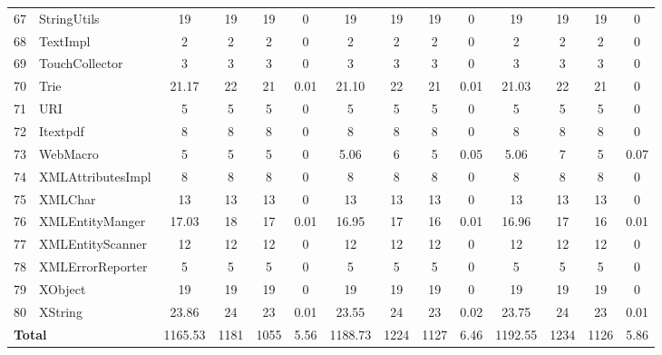 \documentclass[conference]{IEEEtran}
\begin{document}
\begin{table} [ht!]
{\begin{tabular}{c l c c c c c c c c c c c c}
 67						& StringUtils					&19 	&	19	&	19	& 		0					& 19		& 19 		& 19		& 		0			& 19			& 19			& 19			&	0\\      
 68						& TextImpl					& 2 	&	2	&	2	& 		0					& 2		&  2		& 2		& 		0			& 2			& 2			& 2			&	0\\      
 69						& TouchCollector				& 3	&	3	&	3	& 		0					& 3		&  3		& 3		& 		0			& 3			& 3			& 3			&	0\\      
 70						& Trie						& 21.17&	22	&	21	& 		0.01					& 21.10	&  22		& 21		& 		0.01			& 21.03		& 22			& 21			&	0\\      
 71						& URI						& 5 	&	5	&	5	& 		0					& 5		&  5		& 5		& 		0			& 5			& 5			& 5			&	0\\      
 72						& Itextpdf						& 8	&	8	&	8	& 		0					& 8		&  8		& 8		& 		0			& 8			& 8			& 8			&	0\\      
 73						& WebMacro					& 5	&	5	&	5	& 		0					& 5.06	&  6		& 5		& 		0.05			& 5.06		& 7			& 5			&	0.07\\      
 74						& XMLAttributesImpl				& 8	&	8	&	8	& 		0					& 8		&  8		& 8		& 		0			& 8			& 8			& 8			&	0\\      
 75						& XMLChar					& 13	&	13	&	13	& 		0					& 13		&  13		& 13		& 		0			& 13			& 13			& 13			&	0\\      
 76						& XMLEntityManger				& 17.03&	18	&	17	& 		0.01					& 16.95	&  17		& 16		& 		0.01			& 16.96		& 17			& 16			&	0.01\\      
 77						& XMLEntityScanner				& 12	&	12	&	12	& 		0					& 12		&  12		& 12		& 		0			& 12			& 12			& 12			&	0\\      
 78						& XMLErrorReporter				& 5	&	5	&	5	& 		0					& 5		&  5		& 5		& 		0			& 5			& 5			& 5			&	0\\      
 79						& XObject						& 19	&	19	&	19	& 		0					& 19		&  19		& 19		& 		0			& 19			& 19			& 19			&	0\\      
 80						& XString						& 23.86&	24	&	23	& 		0.01					& 23.55	&  24		& 23		& 		0.02			& 23.75		& 24			& 23			&	0.01\\      
    						\multicolumn{2}{l}{\textbf{Total}}						&1165.53	& 1181	&    1055	&		5.56					& 1188.73		&	1224	&	1127	&	6.46			& 1192.55		& 1234		& 1126		& 	5.86\\
     \end{tabular}
    \label{table:Results}
     }
     \end{table}
\end{document}
